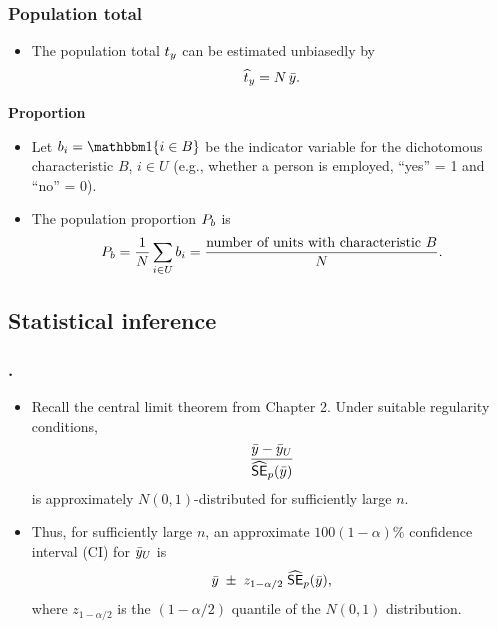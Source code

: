 \documentclass{my_eth_beamer}
\numberwithin{equation}{section}
\begin{document}
\begin{frame}
    \frametitle{\normalsize Population total}
    \begin{itemize}
    \setlength{\itemsep}{8pt}
        \item The \alert{population total} $t_y$ can be estimated unbiasedly by
        \begin{equation*}
            \widehat{t}_y = N \,\bar{y}.
        \end{equation*}
    \end{itemize}

    \vspace{1em}

    \textcolor{fhnwblue}{\textbf{Proportion}}
    \begin{itemize}
    \setlength{\itemsep}{8pt}
        \item Let $b_i = \indicator\{i \in B\}$ be the indicator variable for
            the \alert{dichotomous characteristic} $B$, $i \in U$ (e.g.,
            whether a person is employed, ``yes'' = 1 and ``no'' = 0).
        \item The \alert{population proportion} $P_b$ is
            \begin{equation*}
                P_b = \frac{1}{N} \sum_{i \in U} b_i =
                    \frac{\text{number of units with characteristic $B$}}{N}.
            \end{equation*}
    \end{itemize}
\end{frame}

\subsection{Statistical inference}\label{sec:srs_inference}

\begin{frame}
    \frametitle{\insertsectionnumber.\insertsubsectionnumber~\insertsubsection}
    \begin{itemize}
    \setlength{\itemsep}{12pt}
        \item Recall the \alert{central limit theorem} from Chapter 2.
            Under suitable regularity conditions,
            \begin{equation*}
                \frac{\bar{y} - \bar{y}_U}{\widehat{\mathsf{SE}}_p(\bar{y})}
            \end{equation*}
            is approximately $N(0,1)$-distributed for sufficiently large $n$.
        \item Thus, for sufficiently large $n$, an approximate
            $100(1 - \alpha)\%$ \alert{confidence interval} (CI) for $\bar{y}_U$ is
            \begin{equation}\label{eq:srs_ci}
                \bar{y} \; \pm \; z_{1-\alpha/2}\; \widehat{\mathsf{SE}}_p(\bar{y}),
            \end{equation}
            where $z_{1-\alpha/2}$ is the $(1-\alpha/2)$ quantile of the
            $N(0,1)$ distribution.
        \end{itemize}
\end{frame}
\end{document}
